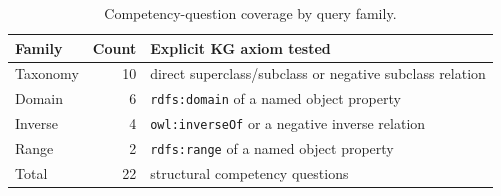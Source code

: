 \begin{table}[tbp]
\centering
\caption{Competency-question coverage by query family.}
\label{tab:qfamilies}
\small
\begin{tabular}{lrp{}}
\toprule
Family & Count & Explicit KG axiom tested\\
\midrule
Taxonomy & 10 & direct superclass/subclass or negative subclass relation\\
Domain & 6 & \texttt{rdfs:domain} of a named object property\\
Inverse & 4 & \texttt{owl:inverseOf} or a negative inverse relation\\
Range & 2 & \texttt{rdfs:range} of a named object property\\
\midrule
Total & 22 & structural competency questions\\
\bottomrule
\end{tabular}
\end{table}
